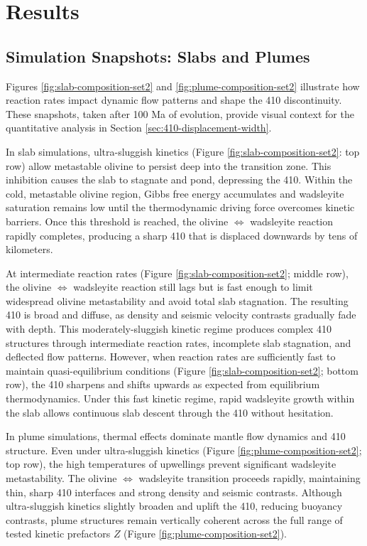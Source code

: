 \documentclass[draft,linenumbers]{agujournal2019}
\begin{document}
\section{Results}\label{sec:results}

\subsection{Simulation Snapshots: Slabs and
Plumes}\label{sec:simulation-snapshots}

Figures \ref{fig:slab-composition-set2} and
\ref{fig:plume-composition-set2} illustrate how reaction rates impact
dynamic flow patterns and shape the 410 discontinuity. These snapshots,
taken after 100 Ma of evolution, provide visual context for the
quantitative analysis in Section \ref{sec:410-displacement-width}.

In slab simulations, ultra-sluggish kinetics (Figure
\ref{fig:slab-composition-set2}: top row) allow metastable olivine to
persist deep into the transition zone. This inhibition causes the slab
to stagnate and pond, depressing the 410. Within the cold, metastable
olivine region, Gibbs free energy accumulates and wadsleyite saturation
remains low until the thermodynamic driving force overcomes kinetic
barriers. Once this threshold is reached, the olivine
\(\Leftrightarrow\) wadsleyite reaction rapidly completes, producing a
sharp 410 that is displaced downwards by tens of kilometers.

At intermediate reaction rates (Figure \ref{fig:slab-composition-set2};
middle row), the olivine \(\Leftrightarrow\) wadsleyite reaction still
lags but is fast enough to limit widespread olivine metastability and
avoid total slab stagnation. The resulting 410 is broad and diffuse, as
density and seismic velocity contrasts gradually fade with depth. This
moderately-sluggish kinetic regime produces complex 410 structures
through intermediate reaction rates, incomplete slab stagnation, and
deflected flow patterns. However, when reaction rates are sufficiently
fast to maintain quasi-equilibrium conditions (Figure
\ref{fig:slab-composition-set2}; bottom row), the 410 sharpens and
shifts upwards as expected from equilibrium thermodynamics. Under this
fast kinetic regime, rapid wadsleyite growth within the slab allows
continuous slab descent through the 410 without hesitation.

In plume simulations, thermal effects dominate mantle flow dynamics and
410 structure. Even under ultra-sluggish kinetics (Figure
\ref{fig:plume-composition-set2}; top row), the high temperatures of
upwellings prevent significant wadsleyite metastability. The olivine
\(\Leftrightarrow\) wadsleyite transition proceeds rapidly, maintaining
thin, sharp 410 interfaces and strong density and seismic contrasts.
Although ultra-sluggish kinetics slightly broaden and uplift the 410,
reducing buoyancy contrasts, plume structures remain vertically coherent
across the full range of tested kinetic prefactors \(Z\) (Figure
\ref{fig:plume-composition-set2}).
\end{document}
